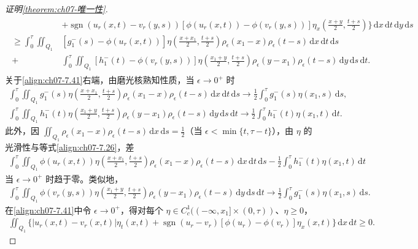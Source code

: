 \documentclass[../../main.tex]{subfiles}%
\begin{document}
\begin{proof}[证明\cref{theorem:ch07-唯一性}]
\begin{align}
\begin{aligned}
&+\operatorname{sgn}(u_r(x,t)-v_r(y,s))[\phi(u_r(x,t))-\phi(v_r(y,s))]\eta_x\left(\frac{x+y}{2},\frac{t+s}{2}\right)\Big\}\,\mathrm{d}x\,\mathrm{d}t\,\mathrm{d}y\,\mathrm{d}s\\
\geqslant\int_0^\tau\iint_{Q_1}&[g_1^-(s)-\phi(u_r(x,t))]\eta\left(\frac{x+x_1}{2},\frac{t+s}{2}\right)\rho_\epsilon(x_1-x)\rho_\epsilon(t-s)\,\mathrm{d}x\,\mathrm{d}t\,\mathrm{d}s\\
+&\int_0^\tau\iint_{Q_1}[h_1^-(t)-\phi(v_r(y,s))]\eta\left(\frac{x_1+y}{2},\frac{t+s}{2}\right)\rho_\epsilon(y-x_1)\rho_\epsilon(t-s)\,\mathrm{d}y\,\mathrm{d}s\,\mathrm{d}t.
\end{aligned} \label{align:ch07-7.41}
\end{align}
关于\eqref{align:ch07-7.41}右端，由磨光核熟知性质，当 $\epsilon\to0^+$ 时
\begin{align*}
\int_0^\tau\iint_{Q_1}g_1^-(s)\eta\left(\frac{x+x_1}{2},\frac{t+s}{2}\right)\rho_\epsilon(x_1-x)\rho_\epsilon(t-s)\,\mathrm{d}x\,\mathrm{d}t\,\mathrm{d}s
\to\frac12\int_0^\tau g_1^-(s)\eta(x_1,s)\,\mathrm{d}s,
\end{align*}
\begin{align*}
\int_0^\tau\iint_{Q_1}h_1^-(t)\eta\left(\frac{x_1+y}{2},\frac{t+s}{2}\right)\rho_\epsilon(y-x_1)\rho_\epsilon(t-s)\,\mathrm{d}y\,\mathrm{d}s\,\mathrm{d}t
\to\frac12\int_0^\tau h_1^-(t)\eta(x_1,t)\,\mathrm{d}t.
\end{align*}
此外，因 $\iint_{Q_1}\rho_\epsilon(x_1-x)\rho_\epsilon(t-s)\,\mathrm{d}x\,\mathrm{d}s=\frac12$（当 $\epsilon<\min\{t,\tau-t\}$），由 $\eta$ 的光滑性与等式\eqref{align:ch07-7.26}，差
\begin{align*}
\int_0^\tau\iint_{Q_1}\phi(u_r(x,t))\eta\left(\frac{x+x_1}{2},\frac{t+s}{2}\right)\rho_\epsilon(x_1-x)\rho_\epsilon(t-s)\,\mathrm{d}x\,\mathrm{d}t\,\mathrm{d}s
-\frac12\int_0^\tau h_1^-(t)\eta(x_1,t)\,\mathrm{d}t
\end{align*}
当 $\epsilon\to0^+$ 时趋于零。类似地，
\begin{align*}
\int_0^\tau\iint_{Q_1}\phi(v_r(y,s))\eta\left(\frac{x_1+y}{2},\frac{t+s}{2}\right)\rho_\epsilon(y-x_1)\rho_\epsilon(t-s)\,\mathrm{d}y\,\mathrm{d}s\,\mathrm{d}t
\to\frac12\int_0^\tau g_1^-(s)\eta(x_1,s)\,\mathrm{d}s.
\end{align*}
在\eqref{align:ch07-7.41}中令 $\epsilon\to0^+$，得对每个 $\eta\in C^1_c((-\infty,x_1]\times(0,\tau))$、$\eta\geqslant0$，
\begin{align}
\iint_{Q_1}\{|u_r(x,t)-v_r(x,t)|\eta_t(x,t)+\operatorname{sgn}(u_r-v_r)[\phi(u_r)-\phi(v_r)]\eta_x(x,t)\}\,\mathrm{d}x\,\mathrm{d}t\geqslant0. \label{align:ch07-7.42}

\end{align}
\end{proof}
\end{document}
